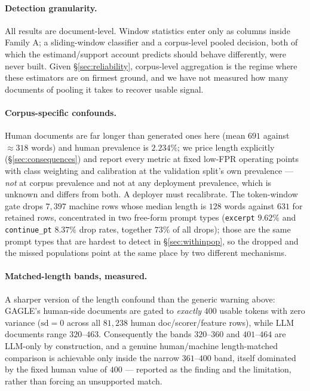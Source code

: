 \documentclass{article}
\begin{document}
\paragraph{Detection granularity.} All results are document-level. Window
statistics enter only as columns inside Family A; a sliding-window classifier and
a corpus-level pooled decision, both of which the estimand/support account
predicts should behave differently, were never built. Given
\S\ref{sec:reliability}, corpus-level aggregation is the regime where these
estimators are on firmest ground, and we have not measured how many documents of
pooling it takes to recover usable signal.

\paragraph{Corpus-specific confounds.} Human documents are far longer than
generated ones here (mean $691$ against $\approx318$ words) and human prevalence
is $2.234\%$; we price length explicitly (\S\ref{sec:consequences}) and report every
metric at fixed low-FPR operating points with class weighting and calibration at
the validation split's own prevalence --- \emph{not} at corpus prevalence and not
at any deployment prevalence, which is unknown and differs from both. A deployer
must recalibrate. The token-window gate drops $7{,}397$ machine rows whose median
length is $128$ words against $631$ for retained rows, concentrated in two
free-form prompt types (\texttt{excerpt} $9.62\%$ and \texttt{continue\_pt}
$8.37\%$ drop rates, together $73\%$ of all drops); those are the same prompt
types that are hardest to detect in \S\ref{sec:withinpop}, so the dropped and the
missed populations point at the same place by two different mechanisms.

\paragraph{Matched-length bands, measured.} A sharper version of the length
confound than the generic warning above: GAGLE's human-side documents are
gated to \emph{exactly} $400$ usable tokens with zero variance
($\text{sd}=0$ across all $81{,}238$ human doc/scorer/feature rows), while LLM
documents range $320$--$463$. Consequently the bands $320$--$360$ and
$401$--$464$ are LLM-only by construction, and a genuine human/machine
length-matched comparison is achievable only inside the narrow $361$--$400$
band, itself dominated by the fixed human value of $400$ --- reported as the
finding and the limitation, rather than forcing an unsupported match.
\end{document}
